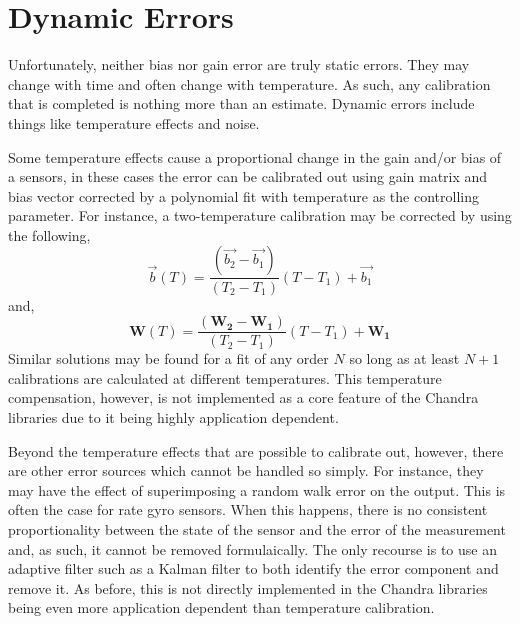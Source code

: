 \documentclass[10pt,letterpaper]{memoir} %
\begin{document}
\section{Dynamic Errors}
Unfortunately, neither bias nor gain error are truly static errors.  They may change with time and often change with temperature.  As such, any calibration that is completed is nothing more than an estimate.  Dynamic errors include things like temperature effects and noise.  

Some temperature effects cause a proportional change in the gain and/or bias of a sensors, in these cases the error can be calibrated out using gain matrix and bias vector corrected by a polynomial fit with temperature as the controlling parameter.  For instance, a two-temperature calibration may be corrected by using the following,
\begin{equation}
	\vec{b}(T) = \frac{(\vec{b_2}-\vec{b_1})}{(T_2-T_1)}(T - T_1) + \vec{b_1}
\end{equation} 
and,
\begin{equation}
	\mathbf{W}(T) = \frac{(\mathbf{W_2}-\mathbf{W_1})}{(T_2-T_1)}(T - T_1) + \mathbf{W_1}
\end{equation} 
Similar solutions may be found for a fit of any order $N$ so long as at least $N+1$ calibrations are calculated at different temperatures.  This temperature compensation, however, is not implemented as a core feature of the Chandra libraries due to it being highly application dependent.

Beyond the temperature effects that are possible to calibrate out, however, there are other error sources which cannot be handled so simply.  For instance, they may have the effect of superimposing a random walk error on the output.  This is often the case for rate gyro sensors.  When this happens, there is no consistent proportionality between the state of the sensor and the error of the measurement and, as such, it cannot be removed formulaically.  The only recourse is to use an adaptive filter such as a Kalman filter to both identify the error component and remove it.  As before, this is not directly implemented in the Chandra libraries being even more application dependent than temperature calibration.
\end{document}
